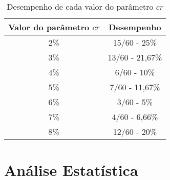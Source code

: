     \begin{table}[h]
        \centering
        \caption{Desempenho de cada valor do parâmetro $cr$}
        \begin{tabular}{|c|c|}
            \hline
            Valor do parâmetro $cr$ & Desempenho \\ \hline
            2\% & 15/60 - 25\%    \\ \hline
            3\% & 13/60 - 21,67\% \\ \hline
            4\% & 6/60  - 10\%    \\ \hline
            5\% & 7/60  - 11,67\% \\ \hline
            6\% & 3/60  - 5\%     \\ \hline
            7\% & 4/60  - 6,66\%  \\ \hline
            8\% & 12/60 - 20\%    \\ \hline
        \end{tabular}
        \label{tab:cr}
    \end{table}
    
    \section{Análise Estatística}
        \label{sec:statistical-analysis}